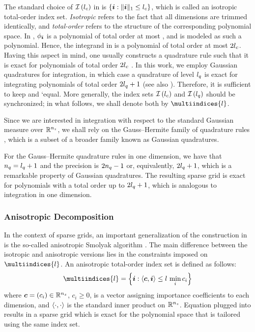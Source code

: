 The standard choice of $\multiindices{\lc}$ in  is
$\{ \multiindex: \norm[1]{\multiindex} \leq \lc \}$, which is called an
isotropic total-order index set. \emph{Isotropic} refers to the fact that all
dimensions are trimmed identically, and \emph{total-order} refers to the
structure of the corresponding polynomial space. In
, $\phi_{\multiindex}$ is a polynomial of total
order at most \lc, and \g is modeled as such a polynomial. Hence, the integrand
in  is a polynomial of total order at most $2 \lc$.
Having this aspect in mind, one usually constructs a quadrature rule such that
it is exact for polynomials of total order $2 \lc$ \cite{eldred2008}. In this
work, we employ Gaussian quadratures for integration, in which case a quadrature
of level $\lq$ is exact for integrating polynomials of total order $2 \lq + 1$
\cite{heiss2008} (see also ). Therefore, it is
sufficient to keep \lc and \lq equal. More generally, the index sets
$\multiindices{\lc}$ and $\multiindices{\lq}$ should be synchronized; in what
follows, we shall denote both by $\multiindices{l}$.

Since we are interested in integration with respect to the standard Gaussian
measure over $\real^\nz$, we shall rely on the Gauss--Hermite family of
quadrature rules \cite{maitre2010}, which is a subset of a broader family known
as Gaussian quadratures.

For the Gauss--Hermite quadrature rules in one dimension, we have that $\nq =
\lq + 1$ and the precision is $2 \nq - 1$ \cite{heiss2008} or, equivalently, $2
\lq + 1$, which is a remarkable property of Gaussian quadratures. The resulting
sparse grid is exact for polynomials with a total order up to $2 \lq + 1$, which
is analogous to integration in one dimension.

\subsubsection{Anisotropic Decomposition}

In the context of sparse grids, an important generalization of the construction
in  is the so-called anisotropic Smolyak algorithm
\cite{nobile2008}. The main difference between the isotropic and anisotropic
versions lies in the constraints imposed on $\multiindices{l}$. An anisotropic
total-order index set is defined as follows:
\begin{equation} \elab{anisotropic-total-order-index-set}
  \multiindices{l} = \left\{ \multiindex: \innerproduct{\v{c}}{\multiindex} \leq l \, \min_i c_i \right\}
\end{equation}
where $\v{c} = (c_i) \in \real^\nz$, $c_i \geq 0$, is a vector assigning
importance coefficients to each dimension, and $\innerproduct{\cdot}{\cdot}$ is
the standard inner product on $\real^\nz$. Equation
 plugged into 
results in a sparse grid which is exact for the polynomial space that is
tailored using the same index set.

